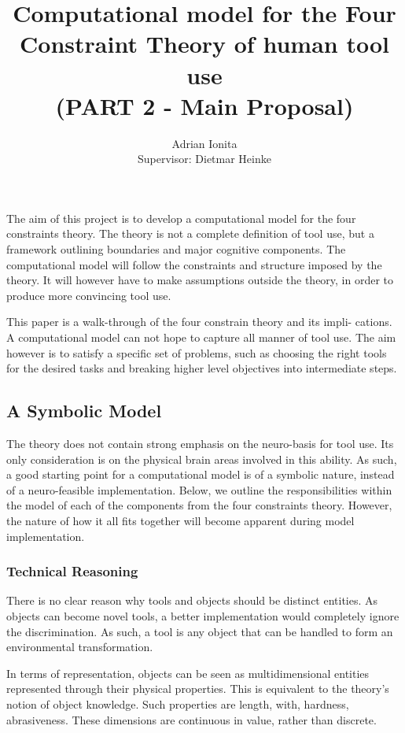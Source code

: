 \documentclass[11]{article}
\title{
  Computational model for the Four Constraint Theory of human tool use\\  
  \setlength{\parskip}{0.5em}  
  \normalsize (PART 2 - Main Proposal)
  }
\date{}
\author{Adrian Ionita\\
Supervisor: Dietmar Heinke}
\begin{document}
\maketitle 	

The aim of this project is to develop a computational model for the four constraints theory.
The theory is not a complete definition of tool use, but a framework outlining boundaries and major cognitive components.   
The computational model will follow the constraints and structure imposed by the theory. 
It will however have to make assumptions outside the theory, in order to produce more convincing tool use. 

This paper is a walk-through of the four constrain theory and its impli- cations. A computational model can not hope to capture all manner of tool use. The aim however is to satisfy a specific set of problems, such as choosing the right tools for the desired tasks and breaking higher level objectives into intermediate steps.

\subsection*{A Symbolic Model}

The theory does not contain strong emphasis on the neuro-basis for tool use. Its only consideration is on the physical brain areas involved in this ability. As such, a good starting point for a computational model is of a symbolic nature, instead of a neuro-feasible implementation. Below, we outline the responsibilities within the model of each of the components from the four constraints theory. However, the nature of how it all fits together will become apparent during model implementation.

\subsubsection*{Technical Reasoning}

There is no clear reason why tools and objects should be distinct entities. As objects can become novel tools, a better implementation would completely ignore the discrimination. As such, a tool is any object that can be handled to form an environmental transformation. 

In terms of representation, objects can be seen as multidimensional entities represented through their physical properties. This is equivalent to the theory's notion of object knowledge. Such properties are length, with, hardness, abrasiveness. These dimensions are continuous in value, rather than discrete. 
\end{document}
